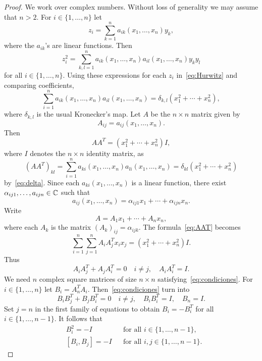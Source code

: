 \begin{proof}
    We work over complex numbers. 
	Without loss of generality we may assume that $n>2$.  For 
	$i\in\{1,\dots,n\}$ let  
	\[
		z_i=\sum_{k=1}^n a_{ik}(x_1,\dots,x_n)y_k,
	\]
	where the $a_{ik}$'s are linear functions. Then 
	\[
		z_i^2=\sum_{k,l=1}^na_{ik}(x_1,\dots,x_n)a_{il}(x_1,\dots,x_n)y_ky_l
	\]
	for all $i\in\{1,\dots,n\}$. Using these expressions for each $z_i$
	in~\eqref{eq:Hurwitz} and comparing coefficients, 
	\begin{equation}
		\label{eq:delta}
		\sum_{i=1}^n a_{ik}(x_1,\dots,x_n)a_{il}(x_1,\dots,x_n)=\delta_{k,l}(x_1^2+\cdots+x_n^2),
	\end{equation}
	where $\delta_{k,l}$ is the usual Kronecker's map. Let 
	$A$ be the $n\times n$ matrix given by 
	\[
	A_{ij}=a_{ij}(x_1,\dots,x_n).
	\]
	Then 
	\begin{equation}
		\label{eq:AAT}
		AA^T=(x_1^2+\cdots+x_n^2)I,
	\end{equation}
	where $I$ denotes the $n\times n$ identity matrix, 
	as 
	\[
		(AA^T)_{kl}=\sum_{i=1}^na_{ki}(x_1,\dots,x_n)a_{li}(x_1,\dots,x_n)=\delta_{kl}(x_1^2+\cdots+x_n^2)
	\]
	by~\eqref{eq:delta}. Since each $a_{ki}(x_1,\dots,x_n)$ is a linear function, 
	there exist $\alpha_{ij1},\dots,a_{ijn}\in\mathbb{C}$ such that 
	\[
		a_{ij}(x_1,\dots,x_n)=\alpha_{ij1}x_1+\cdots+\alpha_{ijn}x_n.
	\]
	Write 
	\[
		A=A_1x_1+\cdots+A_nx_n,
	\]
	where each $A_k$ is the matrix $(A_k)_{ij}=\alpha_{ijk}$. 
	The formula~\eqref{eq:AAT} becomes
	\[
		\sum_{i=1}^n\sum_{j=1}^nA_iA_j^Tx_ix_j=(x_1^2+\cdots+x_n^2)I.
	\]
	Thus 
	\begin{equation}
		\label{eq:condiciones}
		A_iA_j^T+A_jA_i^T=0\quad i\ne j,\quad
		A_iA_i^T=I.
	\end{equation}
	We need $n$ complex square matrices of size $n\times n$
	satisfying~\eqref{eq:condiciones}. For $i\in\{1,\dots,n\}$ let  
	$B_i=A_n^TA_i$. Then~\eqref{eq:condiciones} turn into  
	\[
		B_iB_j^T+B_jB_i^T=0\quad i\ne j,\quad
		B_iB_i^T=I,\quad
		B_n=I.
	\]
	Set $j=n$ in the first family of equations to obtain $B_i=-B_i^T$ for all 
	$i\in\{1,\dots,n-1\}$. It follows that 
	\begin{equation}
	\label{eq:representation}
	\begin{aligned}
	    &B_i^2=-I && \text{for all $i\in\{1,\dots,n-1\}$},\\
	    &[B_i,B_j]=-I && \text{for all $i,j\in\{1,\dots,n-1\}$.}
	\end{aligned}
	\end{equation}
    

\end{proof}
